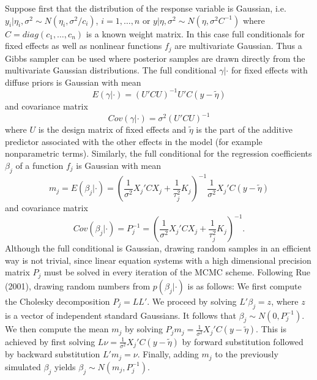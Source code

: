 Suppose first that the distribution of the response variable is
Gaussian, i.e. $y_i | \eta_i, \sigma^2 \sim
N(\eta_i,\sigma^2/c_i)$, $i=1,\dots,n$ or $y | \eta, \sigma^2 \sim
N(\eta,\sigma^2 C^{-1})$ where $C = diag(c_1,\dots,c_n)$ is a
known weight matrix.
 In this case full conditionals for fixed effects
as well as nonlinear functions $f_j$ are multivariate Gaussian.
Thus a Gibbs sampler can be used where posterior samples are drawn
directly from the multivariate Gaussian distributions. The full
conditional $\gamma | \cdot$ for fixed effects  with diffuse
priors is Gaussian with mean
\begin{equation}
\label{meanfixed} E(\gamma | \cdot) = (U'C
U)^{-1}U'C(y-\tilde{\eta} )
\end{equation}
and covariance matrix
\begin{equation}
\label{covfixed} Cov(\gamma | \cdot ) = \sigma^2 (U'CU)^{-1}
\end{equation}
where $U$ is the design matrix of fixed effects and $\tilde{\eta}$
is the part of the additive predictor associated with the other
effects in the model (for example nonparametric terms). Similarly,
the full conditional for the regression coefficients $\beta_j$ of
a function $f_j$ is Gaussian with mean
\begin{equation}
\label{meangaussian} m_j = E(\beta_j | \cdot) = \left(
\frac{1}{\sigma^2} X_j' C X_j + \frac{1}{\tau_j^2} K_j
\right)^{-1} \frac{1}{\sigma^2}X_j'C(y-\tilde{\eta})
\end{equation}
and covariance matrix
\begin{equation}
\label{covgaussian} Cov(\beta_j | \cdot) = P_j^{-1} = \left(
\frac{1}{\sigma^2} X_j'CX_j + \frac{1}{\tau_j^2} K_j \right)^{-1}.
\end{equation}
Although the full conditional is Gaussian, drawing random samples
in an efficient way is not trivial, since linear equation systems
with a high dimensional precision matrix $P_j$ must be solved in
every iteration of the MCMC scheme. Following Rue (2001), drawing
random numbers from $p(\beta_j | \cdot)$ is as follows: We first
compute the Cholesky decomposition $P_j = L L'$. We proceed by
solving $L' \beta_j = z$, where $z$ is a vector of independent
standard Gaussians. It follows that $\beta_j \sim N(0,P_j^{-1})$.
We then compute the mean $m_j$ by solving $P_j m_j =
\frac{1}{\sigma^2} X_j'C(y-\tilde{\eta})$. This is achieved by
first solving $L \nu = \frac{1}{\sigma^2} X_j'C(y-\tilde{\eta})$
by forward substitution followed by backward substitution $L' m_j
= \nu$. Finally, adding $m_j$ to the previously simulated
$\beta_j$ yields $\beta_j \sim N(m_j,P_j^{-1})$.

